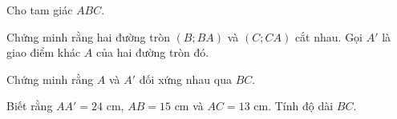 \begin{practice}
\begin{questions}[resume=SBT]
\begin{questions}
            \answerline
            \answerline
        \end{questions}

        \item Cho tam giác $ABC$.
        \begin{questions}
            \item Chứng minh rằng hai đường tròn $(B;BA)$ và $(C;CA)$ cắt nhau. Gọi $A'$ là giao điểm khác $A$ của hai đường tròn đó.

            \answerline
            \answerline
            \item Chứng minh rằng $A$ và $A'$ đối xứng nhau qua $BC$.

            \answerline
            \answerline
            \item Biết rằng $AA'=24$ cm, $AB=15$ cm và $AC=13$ cm. Tính độ dài $BC$.

            \answerline
            \answerline
        \end{questions}
    \end{questions}
\end{practice}

